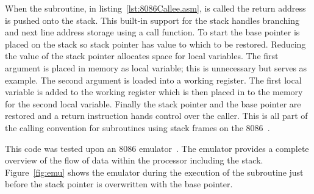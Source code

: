 \documentclass[12pt,a4paper]{article}
\begin{document}
When the subroutine, in listing~\ref{lst:8086Callee.asm}, is called the return address is pushed onto the stack.
This built-in support for the stack handles branching and next line address storage using a call function.
To start the base pointer is placed on the stack so stack pointer has value to which to be restored.
Reducing the value of the stack pointer allocates space for local variables.
The first argument is placed in memory as local variable; this is unnecessary but serves as example.
The second argument is loaded into a working register.
The first local variable is added to the working register which is then placed in to the memory for the second local variable.
Finally the stack pointer and the base pointer are restored and a return instruction hands control over the caller. 
This is all part of the calling convention for subroutines using stack frames on the 8086~\cite{8086call}.
 




This code was tested upon an 8086 emulator~\cite{emu8086}.
The emulator provides a complete overview of the flow of data within the processor including the stack. 
Figure~\ref{fig:emu} shows the emulator during the execution of the subroutine just before the stack pointer is overwritten with the base pointer.
\end{document}
